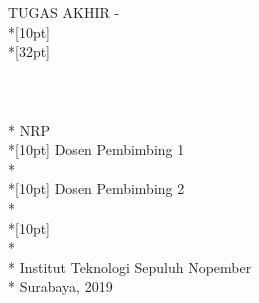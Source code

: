 \newpage

	\sffamily
	\thispagestyle{empty}
	{ \noindent TUGAS AKHIR - \kodematkul }\\*[10pt] 
	{\large\textbf{\MakeUppercase{\judul}}} \\*[32pt]
	\\
	\\
	\\
	\MakeUppercase{\penulis} \\*
	NRP \nrp \\*[10pt]
	Dosen Pembimbing 1 \\*
	\pembimbingsatu \\*[10pt]
	Dosen Pembimbing 2 \\*
	\pembimbingdua \\*[10pt]
	\MakeUppercase{\jurusan} \\*
	\fakultas \\*
	Institut Teknologi Sepuluh Nopember \\*
	Surabaya, 2019
	\rmfamily
	\normalsize
	\restoregeometry
	\color{black}
	\cleardoublepage

